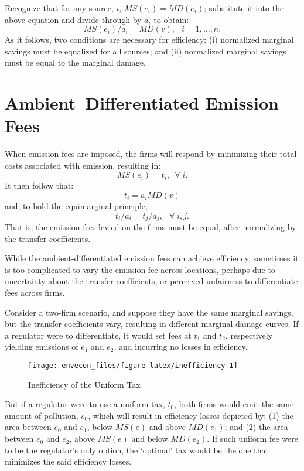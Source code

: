 \documentclass[
]{book}
\begin{document}
Recognize that for any source, \(i\), \(MS(e_i) = MD(e_i)\); substitute it into the above equation and divide through by \(a_{i}\) to obtain: \[MS(e_i)/a_{i} = MD(v),\;~~i=1,\ldots,n.\] As it follows, two conditions are necessary for efficiency: (i) normalized marginal savings must be equalized for all sources; and (ii) normalized marginal savings must be equal to the marginal damage.

\hypertarget{ambientdifferentiated-emission-fees}{%
\section{Ambient--Differentiated Emission Fees}\label{ambientdifferentiated-emission-fees}}

When emission fees are imposed, the firms will respond by minimizing their total costs associated with emission, resulting in: \[MS(e_i) = t_i,\;~\forall\;i.\] It then follow that: \[t_i = a_i MD(v)\] and, to hold the equimarginal principle, \[t_i/a_i = t_j/a_j,\;~~\forall\;i,j.\] That is, the emission fees levied on the firms must be equal, after normalizing by the transfer coefficients.

While the ambient-differentiated emission fees can achieve efficiency, sometimes it is too complicated to vary the emission fee across locations, perhaps due to uncertainty about the transfer coefficients, or perceived unfairness to differentiate fees across firms.

Consider a two-firm scenario, and suppose they have the same marginal savings, but the transfer coefficients vary, resulting in different marginal damage curves. If a regulator were to differentiate, it would set fees at \(t_1\) and \(t_2\), respectively yielding emissions of \(e_1\) and \(e_2\), and incurring no losses in efficiency.

\begin{figure}

{\centering \texttt{[image: envecon\_files/figure-latex/inefficiency-1]} 

}

\caption{Inefficiency of the Uniform Tax}\label{fig:inefficiency}
\end{figure}

But if a regulator were to use a uniform tax, \(t_0\), both firms would emit the same amount of pollution, \(e_0\), which will result in efficiency losses depicted by: (1) the area between \(e_0\) and \(e_1\), below \(MS(e)\) and above \(MD(e_1)\); and (2) the area between \(e_0\) and \(e_2\), above \(MS(e)\) and below \(MD(e_2)\). If such uniform fee were to be the regulator's only option, the `optimal' tax would be the one that minimizes the said efficiency losses.
\end{document}
